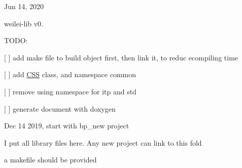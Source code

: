 Jun 14, 2020

weilei-\/lib v0.

T\+O\+DO\+:


\begin{DoxyItemize}
\item \mbox{[} \mbox{]} add make file to build object first, then link it, to reduc ecompiling time
\item \mbox{[} \mbox{]} add \mbox{\hyperlink{class_c_s_s}{C\+SS}} class, and namespace common
\item \mbox{[} \mbox{]} remove {\ttfamily using namespace} for {\ttfamily itp} and {\ttfamily std}
\item \mbox{[} \mbox{]} generate document with {\ttfamily doxygen}
\end{DoxyItemize}

Dec 14 2019, start with bp\+\_\+new project

I put all library files here. Any new project can link to this fold

a makefile should be provided 